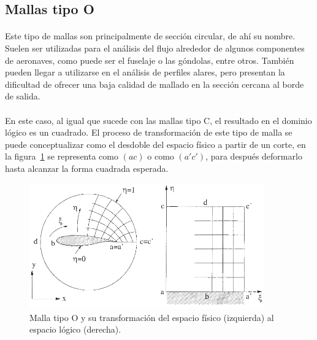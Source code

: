 \documentclass[letterpaper, openright, 12pt]{book}
\begin{document}
    \subsection{Mallas tipo O}
    \paragraph*{}
    Este tipo de mallas son principalmente de sección circular, de ahí su
    nombre. Suelen ser utilizadas para el análisis del flujo alrededor de
    algunos componentes de aeronaves, como puede ser el fuselaje o las
    góndolas, entre otros.\cite{vladimir-grid} También pueden llegar a
    utilizarse en el análisis de perfiles alares, pero presentan la
    dificultad de ofrecer una baja calidad de mallado en la sección cercana al
    borde de salida.~\cite{blazek}\cite{best-practices-grid-generation}

    \paragraph*{}
    En este caso, al igual que sucede con las mallas tipo C, el resultado en
    el dominio lógico es un cuadrado. El proceso de transformación de este
    tipo de malla se puede conceptualizar como el desdoble del espacio
    físico a partir de un corte, en la figura~\ref{fig:malla-o} se
    representa como $(ac)$ o como $(a'c')$, para después deformarlo hasta
    alcanzar la forma cuadrada esperada.
    \begin{figure}[htbp!]
        \centering
            \includegraphics[keepaspectratio, width=0.9\textwidth]{./img/malla-o}
            \captionsetup{margin=2cm}
            \caption[Malla tipo O]{Malla tipo O y su transformación del
            espacio físico (izquierda) al espacio lógico
            (derecha).~\cite{blazek}}
        \label{fig:malla-o}
    \end{figure}
\end{document}
